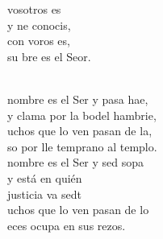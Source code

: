 \begin{cancion}%
	\begin{chorus}%
	 vosotros es \\
	y ne conocis,\\
	con voros es, \\
	su bre es el Seor.\\
	\end{chorus}%
	\jump\\
	nombre es el Ser y pasa hae,\\
	y clama por la bodel hambrie,\\
	uchos que lo ven pasan de la,\\
	so por lle temprano al templo.\\
\jump
	nombre es el Ser y sed sopa\\
y está en quién \\
	justicia va sedt\\
	uchos que lo ven pasan de lo\\
	eces ocupa en sus rezos.\\
\end{cancion}%
